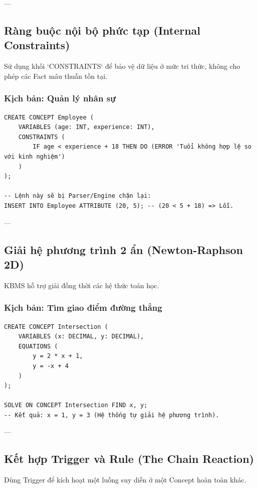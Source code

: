 ---

\subsection{Ràng buộc nội bộ phức tạp (Internal Constraints)}

Sử dụng khối `CONSTRAINTS` để bảo vệ dữ liệu ở mức tri thức, không cho phép các Fact mâu thuẫn tồn tại.

\subsubsection{Kịch bản: Quản lý nhân sự}
\begin{verbatim}
CREATE CONCEPT Employee (
    VARIABLES (age: INT, experience: INT),
    CONSTRAINTS (
        IF age < experience + 18 THEN DO (ERROR 'Tuổi không hợp lệ so với kinh nghiệm')
    )
);

-- Lệnh này sẽ bị Parser/Engine chặn lại:
INSERT INTO Employee ATTRIBUTE (20, 5); -- (20 < 5 + 18) => Lỗi.
\end{verbatim}

---

\subsection{Giải hệ phương trình 2 ẩn (Newton-Raphson 2D)}

KBMS hỗ trợ giải đồng thời các hệ thức toán học.

\subsubsection{Kịch bản: Tìm giao điểm đường thẳng}
\begin{verbatim}
CREATE CONCEPT Intersection (
    VARIABLES (x: DECIMAL, y: DECIMAL),
    EQUATIONS (
        y = 2 * x + 1,
        y = -x + 4
    )
);

SOLVE ON CONCEPT Intersection FIND x, y;
-- Kết quả: x = 1, y = 3 (Hệ thống tự giải hệ phương trình).
\end{verbatim}

---

\subsection{Kết hợp Trigger và Rule (The Chain Reaction)}

Dùng Trigger để kích hoạt một luồng suy diễn ở một Concept hoàn toàn khác.

